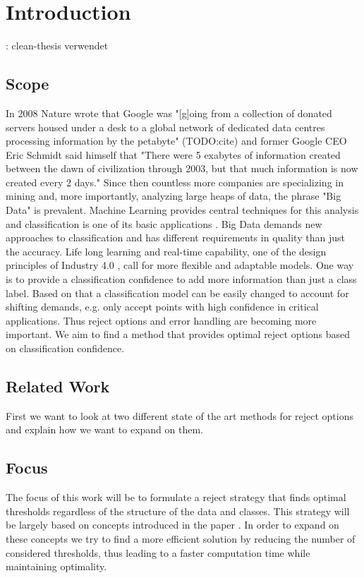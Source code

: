 %
\chapter{Introduction}
\label{sec:intro}
\TODO: clean-thesis verwendet

\section{Scope}
In 2008 Nature wrote that Google was "[g]oing from a collection of donated servers housed under a desk to a global network of dedicated data centres processing information by the petabyte" (TODO:cite) and former Google CEO Eric Schmidt said himself that "There were 5 exabytes of information created between the dawn of civilization through 2003, but that much information is now created every 2 days." Since then countless more companies are specializing in mining and, more importantly, analyzing large heaps of data, the phrase "Big Data" is prevalent. Machine Learning provides central techniques for this analysis and classification is one of its basic applications \cite[p. 5]{Alp:2010}. Big Data demands new approaches to classification and has different requirements in quality than just the accuracy. Life long learning \cite[p. 3]{Sut:2014} and real-time capability, one of the design principles of Industry 4.0 \cite[p. 12]{Her:2015}, call for more flexible and adaptable models. One way is to provide a classification confidence \cite{Del:2005} to add more information than just a class label. Based on that a classification model can be easily changed to account for shifting demands, e.g. only accept points with high confidence in critical applications. Thus reject options and error handling are becoming more important. We aim to find a method that provides optimal reject options based on classification confidence.

\section{Related Work}
First we want to look at two different state of the art methods for reject options and explain how we want to expand on them.

\cite{Ste:2000}

\cite{Cho:1970}

\section{Focus}
The focus of this work will be to formulate a reject strategy that finds optimal thresholds regardless of the  structure of the data and classes. This strategy will be largely based on concepts introduced in the paper \cite{Fis:2015}. In order to expand on these concepts we try to find a more efficient solution by reducing the number of considered thresholds, thus leading to a faster computation time while maintaining optimality.


